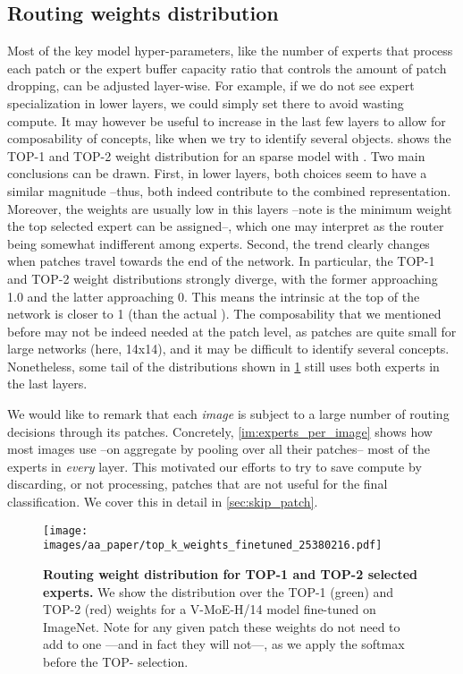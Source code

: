 \documentclass{article}
\newcommand{\abbv}{{V-MoE}}
\begin{document}
\subsection{Routing weights distribution}
\label{app_analysis_routing_weights_distribution}
Most of the key model hyper-parameters, like the number of experts that process each patch  or the expert buffer capacity ratio  that controls the amount of patch dropping, can be adjusted layer-wise.
For example, if we do not see expert specialization in lower layers, we could simply set  there to avoid wasting compute.
It may however be useful to increase  in the last few layers to allow for composability of concepts, like when we try to identify several objects.
 shows the TOP-1 and TOP-2 weight distribution for an sparse model with .
Two main conclusions can be drawn.
First, in lower layers, both choices seem to have a similar magnitude --thus, both indeed contribute to the combined representation.
Moreover, the weights are usually low in this layers --note  is the minimum weight the top selected expert can be assigned--, which one may interpret as the router being somewhat indifferent among experts.
Second, the trend clearly changes when patches travel towards the end of the network.
In particular, the TOP-1 and TOP-2 weight distributions strongly diverge, with the former approaching 1.0 and the latter approaching 0.
This means the intrinsic  at the top of the network is closer to 1 (than the actual ).
The composability that we mentioned before may not be indeed needed at the patch level, as patches are quite small for large networks (here, 14x14), and it may be difficult to identify several concepts.
Nonetheless, some tail of the distributions shown in \cref{im:top_k_weight_distribution} still uses both experts in the last layers.

We would like to remark that each \emph{image} is subject to a large number of routing decisions through its patches.
Concretely, \cref{im:experts_per_image} shows how most images use --on aggregate by pooling over all their patches-- most of the experts in \emph{every} layer.
This motivated our efforts to try to save compute by discarding, or not processing, patches that are not useful for the final classification.
We cover this in detail in \cref{sec:skip_patch}.

\begin{figure}[h]
\centering
\texttt{[image: images/aa\_paper/top\_k\_weights\_finetuned\_25380216.pdf]}
\caption{\textbf{Routing weight distribution for TOP-1 and TOP-2 selected experts.}
We show the distribution over the TOP-1 (green) and TOP-2 (red) weights for a \abbv{}-H/14 model fine-tuned on ImageNet.
Note for any given patch these weights do not need to add to one ---and in fact they will not---, as we apply the softmax before the TOP- selection.
}
\label{im:top_k_weight_distribution}
\end{figure}
\end{document}
